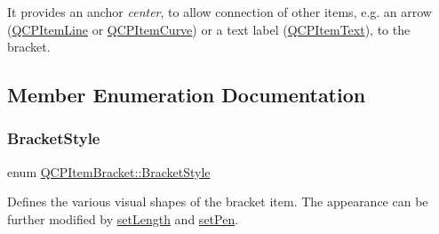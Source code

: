 It provides an anchor {\itshape center}, to allow connection of other items, e.\+g. an arrow (\mbox{\hyperlink{class_q_c_p_item_line}{Q\+C\+P\+Item\+Line}} or \mbox{\hyperlink{class_q_c_p_item_curve}{Q\+C\+P\+Item\+Curve}}) or a text label (\mbox{\hyperlink{class_q_c_p_item_text}{Q\+C\+P\+Item\+Text}}), to the bracket. 

\subsection{Member Enumeration Documentation}
\mbox{\label{class_q_c_p_item_bracket_a7ac3afd0b24a607054e7212047d59dbd}} 
\subsubsection{\texorpdfstring{Bracket\+Style}{BracketStyle}}
{\footnotesize\ttfamily enum \mbox{\hyperlink{class_q_c_p_item_bracket_a7ac3afd0b24a607054e7212047d59dbd}{Q\+C\+P\+Item\+Bracket\+::\+Bracket\+Style}}}

Defines the various visual shapes of the bracket item. The appearance can be further modified by \mbox{\hyperlink{class_q_c_p_item_bracket_ac7cfc3da7da9b5c5ac5dfbe4f0351b2a}{set\+Length}} and \mbox{\hyperlink{class_q_c_p_item_bracket_ab13001d9cc5d8f9e56ea15bdda682acb}{set\+Pen}}.

